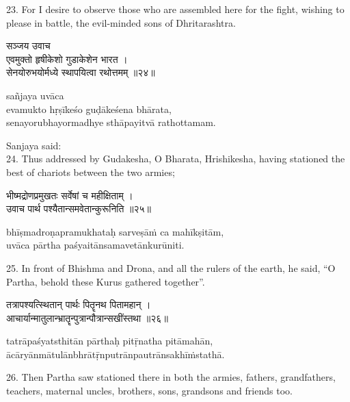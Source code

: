 23. For I desire to observe those who are assembled here for the fight, wishing
to please in battle, the evil-minded sons of Dhritarashtra.

\begin{gitaverse}
सञ्जय उवाच \\
एवमुक्तो हृषीकेशो गुडाकेशेन भारत । \\
सेनयोरुभयोर्मध्ये स्थापयित्वा रथोत्तमम् ॥२४॥
\end{gitaverse}

\begin{transliteration}
sañjaya uvāca \\
evamukto hṛṣīkeśo guḍākeśena bhārata, \\
senayorubhayormadhye sthāpayitvā rathottamam.
\end{transliteration}

Sanjaya said: \\
24. Thus addressed by Gudakesha, O Bharata, Hrishikesha, having stationed the
best of chariots between the two armies;

\begin{gitaverse}
भीष्मद्रोणप्रमुखतः सर्वेषां च महीक्षिताम् । \\
उवाच पार्थ पश्यैतान्समवेतान्कुरूनिति ॥२५॥
\end{gitaverse}

\begin{transliteration}
bhīṣmadroṇapramukhataḥ sarveṣāṁ ca mahīkṣitām, \\
uvāca pārtha paśyaitānsamavetānkurūniti.
\end{transliteration}

25. In front of Bhishma and Drona, and all the rulers of the earth, he said,
``O Partha, behold these Kurus gathered together''.

\begin{gitaverse}
तत्रापश्यत्स्थितान् पार्थः पितॄनथ पितामहान् । \\
आचार्यान्मातुलान्भ्रातॄन्पुत्रान्पौत्रान्सखींस्तथा ॥२६॥
\end{gitaverse}

\begin{transliteration}
tatrāpaśyatsthitān pārthaḥ pitṝnatha pitāmahān, \\
ācāryānmātulānbhrātṝnputrānpautrānsakhīṁstathā.
\end{transliteration}

26. Then Partha saw stationed there in both the armies, fathers, grandfathers,
teachers, maternal uncles, brothers, sons, grandsons and friends too.


